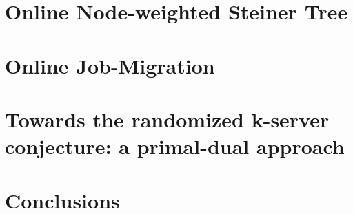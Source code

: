 \documentclass[10pt, twocolumn]{article}
\begin{document}
\section{Online Node-weighted Steiner Tree}


\section{Online Job-Migration}


\section{Towards the randomized k-server conjecture: a primal-dual approach}


\section{Conclusions}



\end{document}
